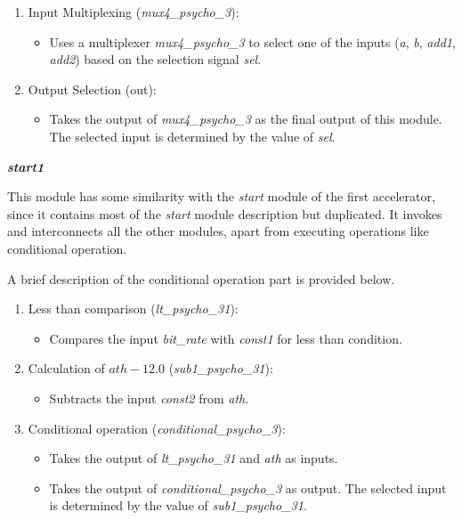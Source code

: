 \documentclass{article}
\begin{document}
\begin{enumerate}

\item Input Multiplexing (\textit{mux4\_psycho\_3}):
\begin{itemize}
\item Uses a multiplexer \textit{mux4\_psycho\_3} to select one of the inputs (\textit{a}, \textit{b}, \textit{add1}, \textit{add2}) based on the selection signal \textit{sel}.
\end{itemize}

\item Output Selection (out):
\begin{itemize}
\item Takes the output of \textit{mux4\_psycho\_3} as the final output of this module. The selected input is determined by the value of \textit{sel}.
\end{itemize}

\end{enumerate}

\vspace{0.5cm}

\textbf{\textit{start1}}

This module has some similarity with the \textit{start} module of the first accelerator, since it contains most of the \textit{start} module description but duplicated.
It invokes and interconnects all the other modules, apart from executing operations like conditional operation.

A brief description of the conditional operation part is provided below.

\begin{enumerate}

\item Less than comparison (\textit{lt\_psycho\_31}):
\begin{itemize}
\item Compares the input \textit{bit\_rate} with \textit{const1} for less than condition.
\end{itemize}

\item Calculation of $ath - 12.0$ (\textit{sub1\_psycho\_31}):
\begin{itemize}
\item Subtracts the input \textit{const2} from \textit{ath}.
\end{itemize}

\item Conditional operation (\textit{conditional\_psycho\_3}):
\begin{itemize}
\item Takes the output of \textit{lt\_psycho\_31} and \textit{ath} as inputs.
\item Takes the output of \textit{conditional\_psycho\_3} as output. The selected input is determined by the value of \textit{sub1\_psycho\_31}.

\end{itemize}

\end{enumerate}
\end{document}
